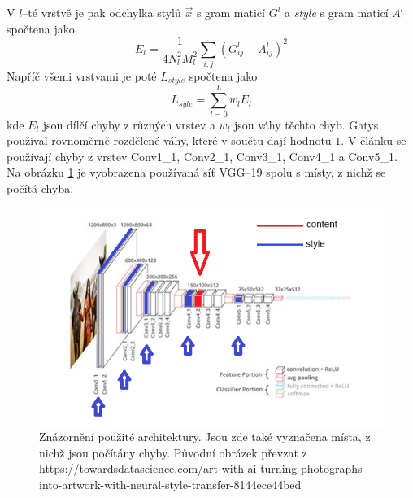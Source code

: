 \documentclass[twocolumn]{article}
\begin{document}
	V $l$--té vrstvě je pak odchylka stylů $\overrightarrow{x}$ s gram maticí $G^l$ a \textit{style} s gram maticí $A^l$ spočtena jako
	\begin{equation*}
		E_l = \frac{1}{4N_l^2M^2_l} \sum_{i,j}(G_{ij}^l - A_{ij}^l)^2
	\end{equation*}
	Napříč všemi vrstvami je poté $L_{style}$ spočtena jako
		\begin{equation*}
		L_{syle} = \sum_{l=0}^{L} w_l E_l
	\end{equation*}
	kde $E_l$ jsou dílčí chyby z různých vrstev a $w_l$ jsou váhy těchto chyb. Gatys používal rovnoměrně rozdělené váhy, které v součtu dají hodnotu $1$. V článku se používají chyby z vrstev Conv1\_1, Conv2\_1, Conv3\_1, Conv4\_1 a Conv5\_1.
	\\
	Na obrázku \ref{VGG} je vyobrazena používaná síť VGG--19 spolu s místy, z nichž se počítá chyba.
	\begin{figure}[h]
	\includegraphics[width=\linewidth]{VGG.png}
	\caption{Znázornění použité architektury. Jsou zde také vyznačena místa, z nichž jsou počítány chyby. Původní obrázek převzat z https://towardsdatascience.com/art-with-ai-turning-photographs-into-artwork-with-neural-style-transfer-8144ece44bed}
	\label{VGG}
\end{figure}
\end{document}

